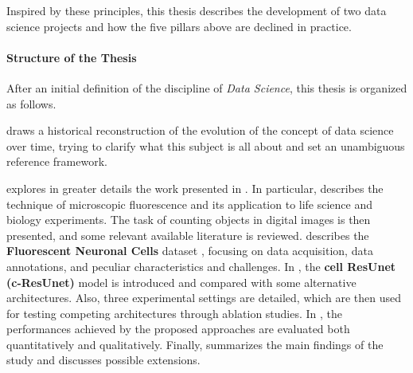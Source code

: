 Inspired by these principles, this thesis describes the development of two data science projects and how the five pillars above are declined in practice.


\paragraph{Structure of the Thesis}

After an initial definition of the discipline of \emph{Data Science}, this thesis is organized as follows.

 draws a historical reconstruction of the evolution of the concept of data science over time, trying to clarify what this subject is all about and set an unambiguous reference framework. 

 explores in greater details the work presented in . In particular,  describes the technique of microscopic fluorescence and its application to life science and biology experiments. The task of counting objects in digital images is then presented, and some relevant available literature is reviewed.
 describes the \textbf{Fluorescent Neuronal Cells} dataset \cite{clissa2021fluocells}, focusing on data acquisition, data annotations, and peculiar characteristics and challenges. 
In , the \textbf{cell ResUnet (c-ResUnet)} \cite{morelli2021cresunet} model is introduced and compared with some alternative architectures. Also, three experimental settings are detailed, which are then used for testing competing architectures through ablation studies.
In , the performances achieved by the proposed approaches are evaluated both quantitatively and qualitatively.
Finally,  summarizes the main findings of the study and discusses possible extensions.



